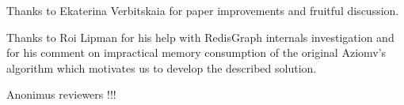 \documentclass[sigconf,edbt,table]{acmart-edbt2021}
\begin{document}
Thanks to Ekaterina Verbitskaia for paper improvements and fruitful discussion.  

Thanks to Roi Lipman for his help with RedisGraph internals investigation and for his comment on impractical memory consumption of the original Aziomv's algorithm which motivates us to develop the described solution.

Anonimus reviewers !!!




%
\end{document}
